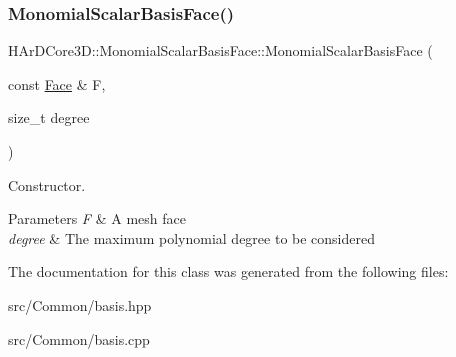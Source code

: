 \subsubsection{\texorpdfstring{Monomial\+Scalar\+Basis\+Face()}{MonomialScalarBasisFace()}}
{\footnotesize\ttfamily H\+Ar\+D\+Core3\+D\+::\+Monomial\+Scalar\+Basis\+Face\+::\+Monomial\+Scalar\+Basis\+Face (\begin{DoxyParamCaption}\item[{const \hyperlink{classHArDCore3D_1_1Face}{Face} \&}]{F,  }\item[{size\+\_\+t}]{degree }\end{DoxyParamCaption})}



Constructor. 


\begin{DoxyParams}{Parameters}
{\em F} & A mesh face \\
\hline
{\em degree} & The maximum polynomial degree to be considered \\
\hline
\end{DoxyParams}


The documentation for this class was generated from the following files\+:\begin{DoxyCompactItemize}
\item 
src/\+Common/basis.\+hpp\item 
src/\+Common/basis.\+cpp\end{DoxyCompactItemize}
